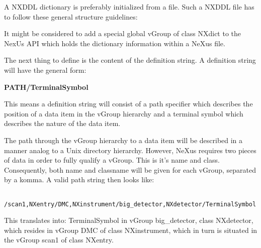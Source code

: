 \documentclass[12pt]{article}
\begin{document}
A NXDDL dictionary is preferably initialized from a file.
Such a NXDDL file has to follow these general structure guidelines:
It might be considered to add a special global vGroup of class NXdict to the
NexUs API which holds the dictionary information within a NeXus file.

 The next thing to define is the content of the definition string. A
 definition string will have the general form: \\
\centerline{\bf PATH/TerminalSymbol}
 This means a definition string will consist of a path specifier which
 describes the position of a data item in the vGroup hierarchy and a
 terminal symbol which describes the nature of the data item. 

 The path through the vGroup hierarchy to a data item will be described in a
 manner analog to a Unix directory hierarchy. However, NeXus requires two
 pieces of data in order to fully qualify a vGroup. This is it's name and
 class. Consequently, both name and classname will be given for each vGroup,
 separated by a komma. A valid path string then looks like: \\
\begin{verbatim} 
     /scan1,NXentry/DMC,NXinstrument/big_detector,NXdetector/TerminalSymbol
\end{verbatim}
 This translates into: TerminalSymbol in vGroup big\_detector, class
 NXdetector, which resides in vGroup DMC of class NXinstrument, which in
 turn is situated in the vGroup scan1 of class NXentry.
\end{document}
